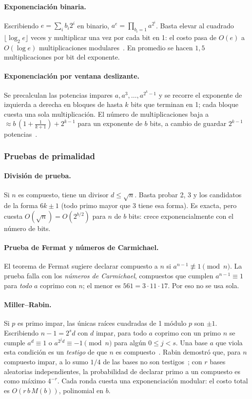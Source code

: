 \paragraph{Exponenciación binaria.} Escribiendo $e = \sum_i b_i 2^i$ en
binario, $a^e = \prod_{b_i = 1} a^{2^i}$. Basta elevar al cuadrado
$\lfloor\log_2 e\rfloor$ veces y multiplicar una vez por cada bit en 1: el
costo pasa de $O(e)$ a $O(\log e)$ multiplicaciones modulares~\cite{knuth}. En
promedio se hacen $1{,}5$ multiplicaciones por bit del exponente.

\paragraph{Exponenciación por ventana deslizante.} Se precalculan las
potencias impares $a, a^3, \dots, a^{2^k-1}$ y se recorre el exponente de
izquierda a derecha en bloques de hasta $k$ bits que terminan en 1; cada bloque
cuesta una sola multiplicación. El número de multiplicaciones baja a
$\approx b\,(1 + \frac{1}{k+1}) + 2^{k-1}$ para un exponente de $b$ bits, a
cambio de guardar $2^{k-1}$ potencias~\cite{knuth,hac}.

\subsubsection{Pruebas de primalidad}

\paragraph{División de prueba.} Si $n$ es compuesto, tiene un divisor
$d \le \sqrt n$. Basta probar 2, 3 y los candidatos de la forma $6k \pm 1$
(todo primo mayor que 3 tiene esa forma). Es exacta, pero cuesta
$O(\sqrt n) = O(2^{b/2})$ para $n$ de $b$ bits: crece exponencialmente con el
número de bits.

\paragraph{Prueba de Fermat y números de Carmichael.} El teorema de Fermat
sugiere declarar compuesto a $n$ si $a^{n-1} \not\equiv 1 \pmod n$. La prueba
falla con los \emph{números de Carmichael}, compuestos que cumplen
$a^{n-1} \equiv 1$ para \emph{todo} $a$ coprimo con $n$; el menor es
$561 = 3 \cdot 11 \cdot 17$. Por eso no se usa sola.

\paragraph{Miller--Rabin.} Si $p$ es primo impar, las únicas raíces
cuadradas de 1 módulo $p$ son $\pm 1$. Escribiendo $n-1 = 2^s d$ con $d$
impar, para todo $a$ coprimo con un primo $n$ se cumple $a^d \equiv 1$ o
$a^{2^j d} \equiv -1 \pmod n$ para algún $0 \le j < s$. Una base $a$ que
viola esta condición es un \emph{testigo} de que $n$ es
compuesto~\cite{miller1976}. Rabin demostró que, para $n$ compuesto impar, a
lo sumo $1/4$ de las bases no son testigos~\cite{rabin1980}; con $r$ bases
aleatorias independientes, la probabilidad de declarar primo a un compuesto
es como máximo $4^{-r}$. Cada ronda cuesta una exponenciación modular: el
costo total es $O(r\,b\,M(b))$, polinomial en $b$.

